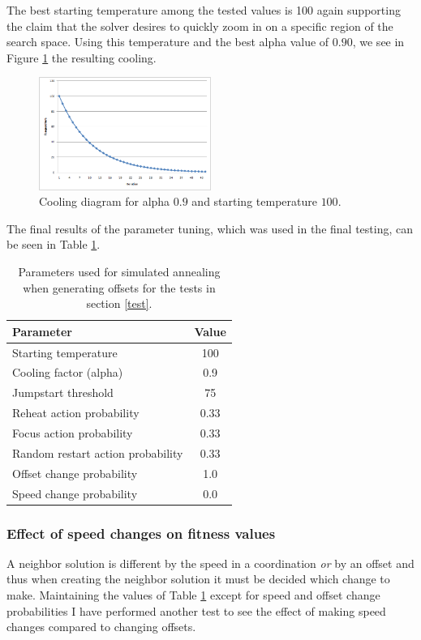 The best starting temperature among the tested values is 100 again supporting the claim that the solver desires to quickly zoom in on a specific region of the search space. Using this temperature and the best alpha value of $0.90$, we see in Figure \ref{fig:cooling_scheme} the resulting cooling.

\begin{figure}[htbp]
\centering
\includegraphics[width=0.5\textwidth]{temp-vs-iter_alpha09_starttemp100.png}
\caption{Cooling diagram for alpha $0.9$ and starting temperature $100$.}
\label{fig:cooling_scheme}
\end{figure}

The final results of the parameter tuning, which was used in the final testing, can be seen in Table \ref{tab:saparms}.

\begin{table}[htbp]
\centering
\begin{tabular}{l|c}
\textbf{Parameter} & \textbf{Value}\\ \hline
Starting temperature & 100 \\
Cooling factor (alpha) & 0.9 \\ 
Jumpstart threshold & 75 \\
Reheat action probability & 0.33 \\
Focus action probability & 0.33 \\
Random restart action probability & 0.33 \\
Offset change probability & 1.0 \\
Speed change probability & 0.0
\end{tabular}
\caption{Parameters used for simulated annealing when generating offsets for the tests in section \ref{test}.}
\label{tab:saparms}
\end{table}

\subsubsection*{Effect of speed changes on fitness values}
A neighbor solution is different by the speed in a coordination \textit{or} by an offset and thus when creating the neighbor solution it must be decided which change to make.
Maintaining the values of Table \ref{tab:saparms} except for speed and offset change probabilities I have performed another test to see the effect of making speed changes compared to changing offsets.

